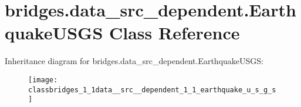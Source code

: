 \hypertarget{classbridges_1_1data__src__dependent_1_1_earthquake_u_s_g_s}{}\section{bridges.\+data\+\_\+src\+\_\+dependent.\+Earthquake\+U\+S\+G\+S Class Reference}
\label{classbridges_1_1data__src__dependent_1_1_earthquake_u_s_g_s}
Inheritance diagram for bridges.\+data\+\_\+src\+\_\+dependent.\+Earthquake\+U\+S\+G\+S\+:\begin{figure}[H]
\begin{center}
\leavevmode
\texttt{[image: classbridges\_1\_1data\_\_src\_\_dependent\_1\_1\_earthquake\_u\_s\_g\_s]}
\end{center}
\end{figure}
